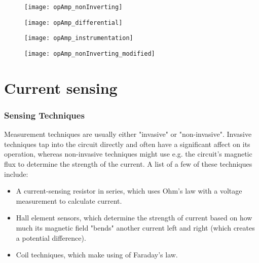 \begin{figure}[!h]
    \centering
    \begin{minipage}{.23\textwidth}
        \centering
        \texttt{[image: opAmp\_nonInverting]}
        \label{fig:opamp-non-inverting}
    \end{minipage}
    \begin{minipage}{.23\textwidth}
        \centering
        \texttt{[image: opAmp\_differential]}
        \label{fig:opamp-differential}
    \end{minipage}
    \begin{minipage}{.23\textwidth}
        \centering
        \texttt{[image: opAmp\_instrumentation]}
        \label{fig:opamp-instrumentation}
    \end{minipage}
    \begin{minipage}{.23\textwidth}
        \centering
        \texttt{[image: opAmp\_nonInverting\_modified]}
        \label{fig:opamp-non-inverting-filter}
    \end{minipage}    

\end{figure}

\pagebreak
\section{Current sensing}\label{sec:cursens}

\subsubsection{Sensing Techniques}\label{sec:cur_sum}
Measurement techniques are usually either "invasive" or "non-invasive". Invasive techniques tap into the circuit directly and often have a significant affect
on its operation, whereas non-invasive techniques might use e.g. the circuit's magnetic flux to determine the strength of the current.
A list of a few of these techniques \cite{currentSenseMethods} include:
\begin{itemize}
    \item A current-sensing resistor in series, which uses Ohm's law with a voltage measurement to calculate current.
    \item Hall element sensors, which determine the strength of current based on how much its magnetic field "bends" another current left and right (which creates a potential difference).
    \item Coil techniques, which make using of Faraday's law.
\end{itemize}


